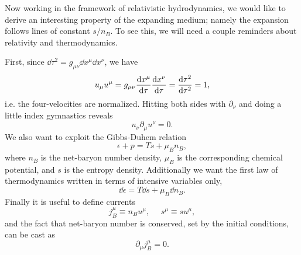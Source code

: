 Now working in the framework of relativistic hydrodynamics, we would like to
derive an interesting property of the expanding medium; namely the expansion
follows lines of constant $s/n_B$. To see this, we will need a couple reminders
about relativity and thermodynamics.

First, since $\dd\tau^2=g_{\mu\nu}\dd{x}^\mu\dd{x}^\nu$, we have
\begin{equation}\label{eq:unormal}
u_\mu u^\mu=g_{\mu\nu}\dv{x^\mu}{\tau}\dv{x^\nu}{\tau}
=\frac{\dd\tau^2}{\dd\tau^2}=1,
\end{equation}
i.e. the four-velocities are normalized. Hitting both sides with
$\partial_\nu$ and doing a little index gymnastics reveals 
\begin{equation}\label{eq:updvu}
u_\nu\partial_\mu u^\nu=0.
\end{equation}
We also want to exploit the
Gibbs-Duhem relation
\begin{equation}
\epsilon+p=Ts+\mu_Bn_B,
\end{equation}
where $n_B$ is the net-baryon number density, $\mu_B$ is the corresponding
chemical potential, and $s$ is the entropy density. Additionally we want the first
law of thermodynamics written in terms of intensive variables only,
\begin{equation}
\dd\epsilon=T\dd s+\mu_B\dd n_B.
\end{equation}
Finally it is useful to define currents
\begin{equation}
j_B^\mu\equiv n_Bu^\mu,~~~~~~s^\mu\equiv su^\mu,
\end{equation}
and the fact that net-baryon number is conserved, set by the initial conditions,
can be cast as
\begin{equation}
\partial_\mu j_B^\mu=0.
\end{equation}

